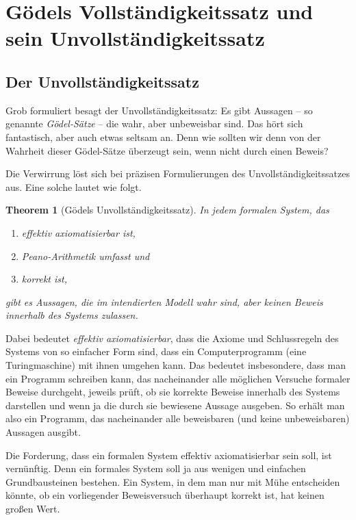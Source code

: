 \documentclass[twoside]{../zirkelblatt1415}
\theoremstyle{definition}
\theoremstyle{plain}
\newtheorem{thm}[defn]{Theorem}
\theoremstyle{remark}
\begin{document}
\newpage


\section{Gödels Vollständigkeitssatz und sein Unvollständigkeitssatz}

\subsection{Der Unvollständigkeitssatz}

Grob formuliert besagt der Unvollständigkeitssatz: Es gibt Aussagen -- so
genannte \emph{Gödel-Sätze} -- die wahr, aber unbeweisbar sind. Das hört sich
fantastisch, aber auch etwas seltsam an. Denn wie sollten wir denn von der
Wahrheit dieser Gödel-Sätze überzeugt sein, wenn nicht durch einen Beweis?

Die Verwirrung löst sich bei präzisen Formulierungen des
Unvollständigkeitssatzes aus. Eine solche lautet wie folgt.

\begin{thm}[Gödels Unvollständigkeitssatz]In jedem formalen System, das
\begin{enumerate}
\item effektiv axiomatisierbar ist,
\item Peano-Arithmetik umfasst und
\item korrekt ist,
\end{enumerate}
gibt es Aussagen, die im intendierten Modell wahr sind, aber keinen Beweis
innerhalb des Systems zulassen.
\end{thm}

Dabei bedeutet \emph{effektiv axiomatisierbar}, dass die Axiome und
Schlussregeln des Systems von so einfacher Form sind, dass ein Computerprogramm
(eine Turingmaschine) mit ihnen umgehen kann. Das bedeutet insbesondere, dass
man ein Programm schreiben kann, das nacheinander alle möglichen Versuche
formaler Beweise durchgeht, jeweils prüft, ob sie korrekte Beweise innerhalb des
Systems darstellen und wenn ja die durch sie bewiesene Aussage ausgeben. So
erhält man also ein Programm, das nacheinander alle beweisbaren (und keine
unbeweisbaren) Aussagen ausgibt.

Die Forderung, dass ein formalen System effektiv axiomatisierbar sein soll, ist
vernünftig. Denn ein formales System soll ja aus wenigen und einfachen
Grundbausteinen bestehen. Ein System, in dem man nur mit Mühe entscheiden
könnte, ob ein vorliegender Beweisversuch überhaupt korrekt ist, hat keinen
großen Wert.
\end{document}
